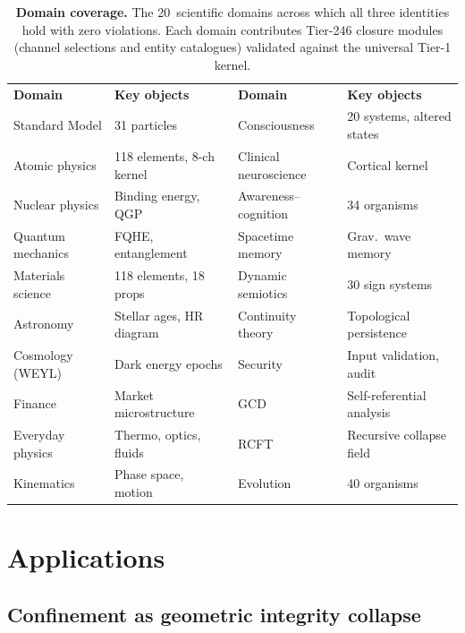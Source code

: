\documentclass[
  aps,
  prx,
  twocolumn,
  superscriptaddress,
  nofootinbib,
  floatfix
]{revtex4-2}
\begin{document}
\begin{table}[!htbp]
\caption{\textbf{Domain coverage.} The 20~scientific domains
across which all three identities hold with zero violations.
Each domain contributes Tier-246 closure modules (channel selections and
entity catalogues) validated against the universal Tier-1 kernel.}
\label{tab:domains}
\begin{ruledtabular}
\begin{tabular}{llll}
\textbf{Domain} & \textbf{Key objects}
& \textbf{Domain} & \textbf{Key objects} \\
\colrule
Standard Model & 31 particles &
  Consciousness & 20 systems, altered states \\
Atomic physics & 118 elements, 8-ch kernel &
  Clinical neuroscience & Cortical kernel \\
Nuclear physics & Binding energy, QGP &
  Awareness--cognition & 34 organisms \\
Quantum mechanics & FQHE, entanglement &
  Spacetime memory & Grav.\ wave memory \\
Materials science & 118 elements, 18 props &
  Dynamic semiotics & 30 sign systems \\
Astronomy & Stellar ages, HR diagram &
  Continuity theory & Topological persistence \\
Cosmology (WEYL) & Dark energy epochs &
  Security & Input validation, audit \\
Finance & Market microstructure &
  GCD & Self-referential analysis \\
Everyday physics & Thermo, optics, fluids &
  RCFT & Recursive collapse field \\
Kinematics & Phase space, motion &
  Evolution & 40 organisms \\
\end{tabular}
\end{ruledtabular}
\end{table}

\section{Applications}

\subsection{Confinement as geometric integrity collapse}
\end{document}
